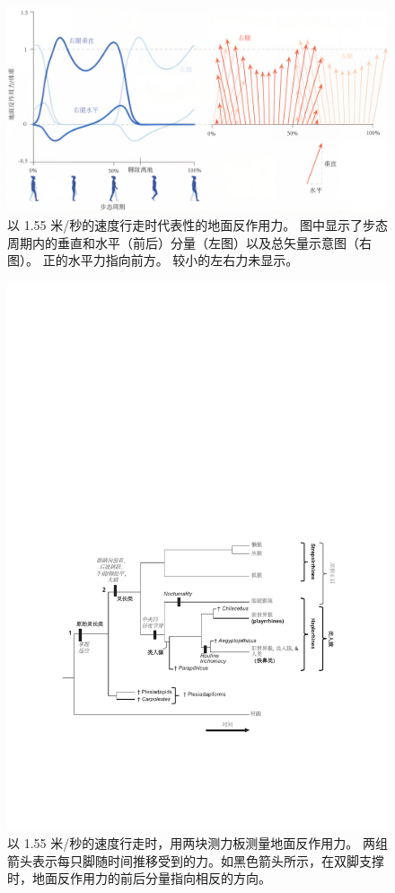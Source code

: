 \begin{figure}[!htb]
	\centering
	\includegraphics[width=1.0\linewidth]{chap2/2_4}
	\caption{以 1.55 米/秒的速度行走时代表性的地面反作用力。
		图中显示了步态周期内的垂直和水平（前后）分量（左图）以及总矢量示意图（右图）。
		正的水平力指向前方。
		较小的左右力未显示\cite{dembia2017simulating}。\label{fig:2_4}}
\end{figure}


\begin{figure}[!htb]
	\centering
	\includegraphics[width=0.9\linewidth]{chap2/2_5}
	\caption{以 1.55 米/秒的速度行走时，用两块测力板测量地面反作用力。
		两组箭头表示每只脚随时间推移受到的力。​​
		如黑色箭头所示，在双脚支撑时，地面反作用力的前后分量指向相反的方向。 \label{fig:2_5}}
\end{figure}


